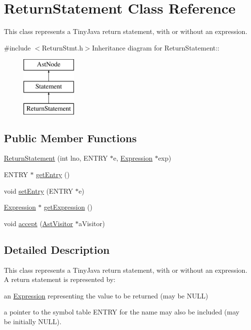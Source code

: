 \hypertarget{classReturnStatement}{
\section{ReturnStatement Class Reference}
\label{classReturnStatement}
}


This class represents a TinyJava return statement, with or without an expression.  


{\ttfamily \#include $<$ReturnStmt.h$>$}Inheritance diagram for ReturnStatement::\begin{figure}[H]
\begin{center}
\leavevmode
\includegraphics[height=3cm]{classReturnStatement}
\end{center}
\end{figure}
\subsection*{Public Member Functions}
\begin{DoxyCompactItemize}
\item 
\hyperlink{classReturnStatement_a24684312040304edbc031695431317ff}{ReturnStatement} (int lno, ENTRY $\ast$e, \hyperlink{classExpression}{Expression} $\ast$exp)
\item 
ENTRY $\ast$ \hyperlink{classReturnStatement_acecfc9f66e24cc51f1038234cf886229}{getEntry} ()
\item 
void \hyperlink{classReturnStatement_a92ec20af78eb69baae892b95946ceeb5}{setEntry} (ENTRY $\ast$e)
\item 
\hyperlink{classExpression}{Expression} $\ast$ \hyperlink{classReturnStatement_a219347b1f7f79387888f3252a7e07bad}{getExpression} ()
\item 
void \hyperlink{classReturnStatement_a491cb39772b9054be31d27dbc0d72d0f}{accept} (\hyperlink{classAstVisitor}{AstVisitor} $\ast$aVisitor)
\end{DoxyCompactItemize}


\subsection{Detailed Description}
This class represents a TinyJava return statement, with or without an expression. A return statement is represented by:
\begin{DoxyItemize}
\item an \hyperlink{classExpression}{Expression} representing the value to be returned (may be NULL)
\item a pointer to the symbol table ENTRY for the name may also be included (may be initially NULL).
\end{DoxyItemize}

